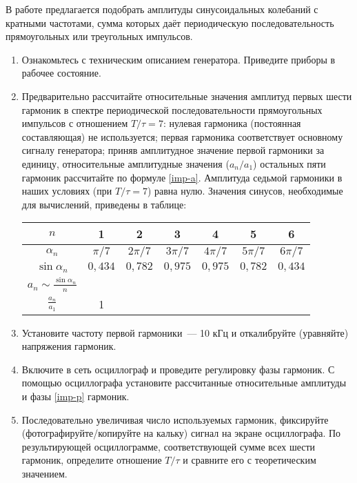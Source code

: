 \begin{lab:task}

В работе предлагается подобрать амплитуды синусоидальных колебаний с кратными
частотами, сумма которых даёт периодическую последовательность прямоугольных или
треугольных импульсов.


\begin{enumerate}
	\item Ознакомьтесь с техническим описанием генератора. Приведите
приборы в рабочее состояние.

\item Предварительно рассчитайте относительные значения амплитуд первых шести
гармоник в спектре периодической последовательности прямоугольных импульсов с
отношением $T/\tau=7$: нулевая гармоника (постоянная составляющая) не
используется; первая гармоника соответствует основному сигналу генератора;
приняв амплитудное значение первой гармоники за единицу, относительные
амплитудные значения ($a_n/a_1$) остальных пяти гармоник рассчитайте по формуле
\eqref{imp-a}. Амплитуда седьмой гармоники в наших условиях (при
$T/\tau=7$) равна нулю. Значения синусов, необходимые для вычислений, приведены
в таблице:
\begin{center}
\begin{tabular}{|c|c|c|c|c|c|c|} \hline
$n$ & 1 & 2 & 3 & 4 & 5 & 6 \\ \hline $\alpha_n$&$\pi /7$&$2\pi /7$&$3\pi
/7$&$4\pi /7$&$5\pi /7$& $6\pi /7$ \\ \hline
$\sin \alpha_n$ & $0{,}434$ & $0{,}782$ & $0{,}975$ & $0{,}975$ &$0{,}782$ &
$0{,}434$ \\ \hline $a_n\sim\frac{\sin
\alpha_n}{n}$& & & & & & \\ \hline $\frac{a_n}{a_1}$&1& & & & & \\ \hline
\end{tabular}
\end{center}

	\item Установите частоту первой гармоники~--- 10 кГц и
откалибруйте (уравняйте) напряжения гармоник.
	\item Включите в сеть осциллограф и проведите регулировку фазы
гармоник. С помощью осциллографа установите рассчитанные относительные амплитуды
и фазы \eqref{imp-p} гармоник.
	\item Последовательно увеличивая число используемых гармоник, фиксируйте
(фотографируйте/копируйте на кальку) сигнал на экране осциллографа. По
результирующей осциллограмме, соответствующей сумме всех шести гармоник,
определите отношение $T/\tau$ и сравните его с теоретическим значением.


\end{enumerate}
\end{lab:task}
